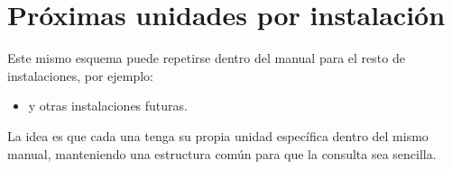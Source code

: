 ﻿\section{Próximas unidades por instalación}

Este mismo esquema puede repetirse dentro del manual para el resto de instalaciones, por ejemplo:

\begin{itemize}
\item y otras instalaciones futuras.
\end{itemize}

La idea es que cada una tenga su propia unidad específica dentro del mismo manual, manteniendo una estructura común para que la consulta sea sencilla.

